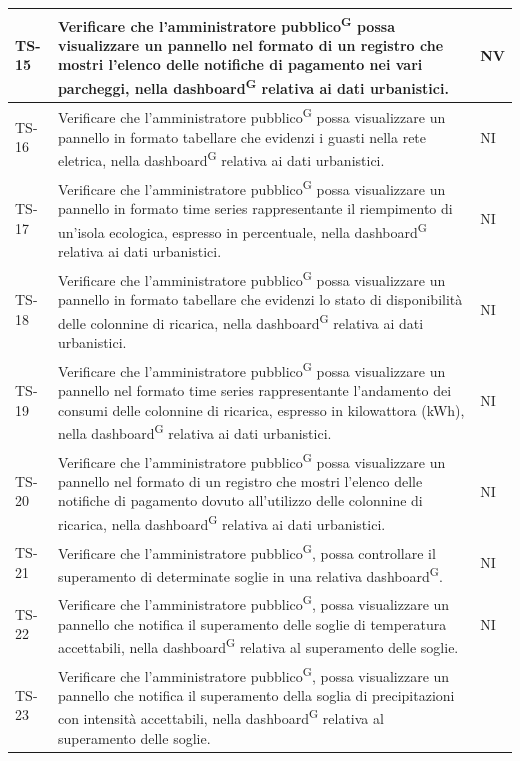 \documentclass[8pt]{article}
\newcommand{\glossterm}[1]{#1\textsuperscript{G}} %
\begin{document}
\begin{longtable}{|>{\centering}p{2cm}|>{\RaggedRight}m{12cm}|>{\centering\arraybackslash}p{2cm}|}
    \hline
    TS-15 & 
    Verificare che l’\glossterm{amministratore pubblico} possa visualizzare un pannello nel formato di un registro che mostri l'elenco delle notifiche di pagamento nei vari parcheggi, nella \glossterm{dashboard} relativa ai dati urbanistici.& NV \\
    \hline
    TS-16 & 
    Verificare che l’\glossterm{amministratore pubblico} possa visualizzare un pannello in formato tabellare che evidenzi i guasti nella rete eletrica, nella \glossterm{dashboard} relativa ai dati urbanistici.& NI \\
    \hline
    TS-17 & 
    Verificare che l’\glossterm{amministratore pubblico} possa visualizzare un pannello in formato time series rappresentante il riempimento di un'isola ecologica, espresso in percentuale, nella \glossterm{dashboard} relativa ai dati urbanistici.& NI \\
    \hline
    TS-18 & 
    Verificare che l’\glossterm{amministratore pubblico} possa visualizzare un pannello in formato tabellare che evidenzi lo stato di disponibilità delle colonnine di ricarica, nella \glossterm{dashboard} relativa ai dati urbanistici.& NI \\
    \hline
    TS-19 & 
    Verificare che l’\glossterm{amministratore pubblico} possa visualizzare un pannello nel formato time series rappresentante l'andamento dei consumi delle colonnine di ricarica, espresso in kilowattora (kWh), nella \glossterm{dashboard} relativa ai dati urbanistici.& NI \\
    \hline
    TS-20 & 
    Verificare che l’\glossterm{amministratore pubblico} possa visualizzare un pannello nel formato di un registro che mostri l'elenco delle notifiche di pagamento dovuto all'utilizzo delle colonnine di ricarica, nella \glossterm{dashboard} relativa ai dati urbanistici.& NI \\
    \hline
    TS-21 & Verificare che l’\glossterm{amministratore pubblico}, possa controllare il superamento di determinate soglie in una relativa \glossterm{dashboard}. &
    NI \\
    \hline
    TS-22 & Verificare che l’\glossterm{amministratore pubblico}, possa visualizzare un pannello che notifica il superamento delle soglie di temperatura accettabili, nella \glossterm{dashboard} relativa al superamento delle soglie. &
    NI \\
    \hline
    TS-23 &Verificare che l’\glossterm{amministratore pubblico}, possa visualizzare un pannello che notifica il superamento della soglia di precipitazioni con intensità accettabili, nella \glossterm{dashboard} relativa al superamento delle soglie. &

\end{longtable}
\end{document}
